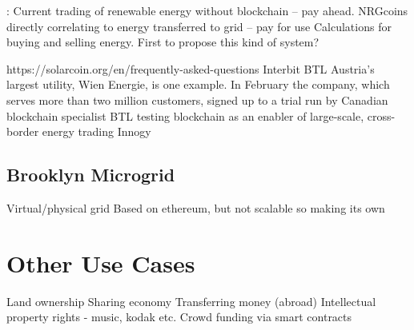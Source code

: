 
\cite{NRGcoin_Mihaylov} : Current trading of renewable energy without blockchain – pay ahead. NRGcoins directly correlating to energy transferred to grid – pay for use Calculations for buying and selling energy. First to propose this kind of system?


https://solarcoin.org/en/frequently-asked-questions
Interbit BTL
Austria’s largest utility, Wien Energie, is one example. In February the company, which serves more than two million customers, signed up to a trial run by Canadian blockchain specialist BTL testing blockchain as an enabler of large-scale, cross-border energy trading %
Innogy

\subsection{Brooklyn Microgrid}

Virtual/physical grid %
Based on ethereum, but not scalable so making its own


\section{Other Use Cases}
Land ownership
Sharing economy
Transferring money (abroad)
Intellectual property rights - music, kodak etc.  
Crowd funding via smart contracts 